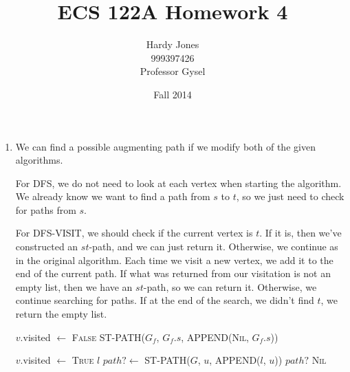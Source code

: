 \documentclass[12pt,letterpaper]{article}
\title{ECS 122A Homework 4\vspace{-2ex}}
\author{Hardy Jones\\
        999397426\\
        Professor Gysel\vspace{-2ex}}
\date{Fall 2014}
\begin{document}
  \maketitle

  \begin{enumerate}
    \item

      We can find a possible augmenting path if we modify both of the given algorithms.

      For DFS, we do not need to look at each vertex when starting the algorithm.
      We already know we want to find a path from $s$ to $t$, so we just need to check for paths from $s$.

      For DFS-VISIT, we should check if the current vertex is $t$.
      If it is, then we've constructed an $st$-path, and we can just return it.
      Otherwise, we continue as in the original algorithm.
      Each time we visit a new vertex, we add it to the end of the current path.
      If what was returned from our visitation is not an empty list,
      then we have an $st$-path, so we can return it.
      Otherwise, we continue searching for paths.
      If at the end of the search, we didn't find $t$, we return the empty list.

      \begin{algorithm}
        \begin{algorithmic}
              \State $v$.visited $\gets$ \textsc{False}
            \EndFor
            \State \Return ST-PATH($G_f$, $G_f.s$, APPEND(\textsc{Nil}, $G_f.s$))
          \EndFunction
        \end{algorithmic}
      \end{algorithm}

      \begin{algorithm}
        \begin{algorithmic}
            \State $v$.visited $\gets$ \textsc{True}
              \State \Return $l$
            \EndIf
                \State $path? \gets$ ST-PATH($G$, $u$, APPEND($l$, $u$))
                  \State \Return $path?$
                \EndIf
              \EndIf
            \EndFor
            \State \Return \textsc{Nil}
          \EndFunction
        \end{algorithmic}
      \end{algorithm}
  \end{enumerate}
\end{document}
